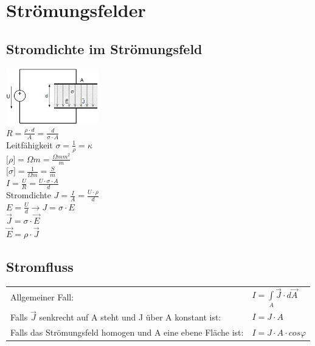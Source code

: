 \newpage
\section{Strömungsfelder}
\subsection{Stromdichte im Strömungsfeld}
\begin{multicols}{2}
\includegraphics[width=0.3\textwidth]{pics/stroemungsfeld/platten}\\
$ R = \frac{\rho \cdot d}{A} = \frac{d}{\sigma \cdot A}$\\
Leitfähigkeit $ \sigma = \frac{1}{\rho} = \kappa $\\
$ \lbrack \rho \rbrack = \Omega m = \frac{\Omega mm^2}{m} $\\
$ \lbrack \sigma \rbrack = \frac{1}{\Omega m} = \frac{S}{m} $\\
$ I = \frac{U}{R} = \frac{U \cdot \sigma \cdot A}{d} $\\
Stromdichte $ J = \frac{I}{A} = \frac{U \cdot \rho}{d} $\\
$ E = \frac{U}{d} \rightarrow J = \sigma \cdot E $\\
$ \vec J = \sigma \cdot \vec E $ \\
$ \vec E = \rho \cdot \vec J $ \\
\end{multicols}

\subsection{Stromfluss}
\begin{tabular}{ll}
Allgemeiner Fall: & $ I = \int\limits_{A} \vec J \cdot d\vec A $ \\
Falls $ \vec J $ senkrecht auf A steht und J über A konstant ist: & $I = J \cdot A$ \\
Falls das Strömungsfeld homogen und A eine ebene Fläche ist: & $ I = J \cdot A \cdot cos \varphi $
\end{tabular}

